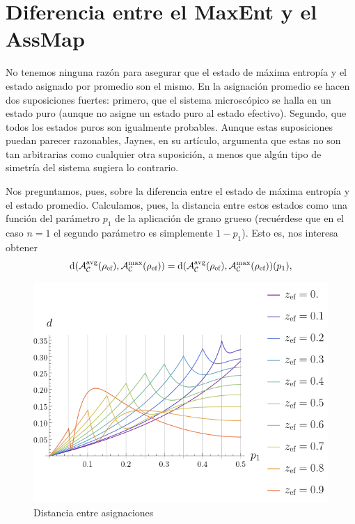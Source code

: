 \section{Diferencia entre el MaxEnt y el AssMap}


No tenemos ninguna razón para asegurar que el estado de máxima entropía y el estado asignado por promedio son el mismo. En la asignación promedio se hacen dos suposiciones fuertes: primero, que el sistema microscópico se halla en un estado puro (aunque no asigne un estado puro al estado efectivo). Segundo, que todos los estados puros son igualmente probables. Aunque estas suposiciones puedan parecer razonables, Jaynes, en su artículo, argumenta que estas no son tan arbitrarias como cualquier otra suposición, a menos que algún tipo de simetría del sistema sugiera lo contrario.

Nos preguntamos, pues, sobre la diferencia entre el estado de máxima entropía y el estado promedio. Calculamos, pues, la distancia entre estos estados como una función del parámetro $p_{1}$ de la aplicación de grano grueso (recuérdese que en el caso $n=1$ el segundo parámetro es simplemente $1-p_{1}$). Esto es, nos interesa obtener
\begin{equation}
    \text{d}\qty(\mathcal{A}_{\mathcal{C}}^{\text{avg}}(\rho_{\text{ef}}),\mathcal{A}_{\mathcal{C}}^{\max}(\rho_{\text{ef}}))=\text{d}\qty(\mathcal{A}_{\mathcal{C}}^{\text{avg}}(\rho_{\text{ef}}),\mathcal{A}_{\mathcal{C}}^{\max}(\rho_{\text{ef}}))(p_{1}),\nonumber
\end{equation}

\begin{figure}[ht!]
    \centering
      \includegraphics[width=0.9\linewidth]{chapter4/figures/maxavgdisr.png}
    \caption{Distancia entre asignaciones}
    \label{fig:AvgMaxDist}
\end{figure}

